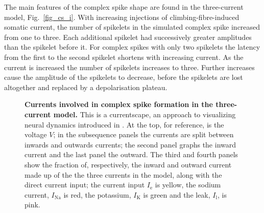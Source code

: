 \documentclass[twocolumn]{svjour3}          %
\newcommand{\mse}{\,\mathrm{ms}}
\renewcommand{\k}{\mathrm{K}}
\newcommand{\na}{\mathrm{Na}}
\newcommand{\leak}{\mathrm{l}}
\begin{document}

The main features of the complex spike shape are found in the
three-current model, Fig.~\ref{fig_cs_i}. With increasing injections
of climbing-fibre-induced somatic current, the number of spikelets in
the simulated complex spike increased from one to three. Each
additional spikelet had successively greater amplitudes than the
spikelet before it. For complex spikes with only two spikelets the
latency from the first to the second spikelet shortens with increasing
current. As the current is increased the number of spikelets increases
to three. Further increases cause the amplitude of the spikelets to
decrease, before the spikelets are lost altogether and replaced by a
depolarisation plateau. 

\begin{figure}[!ht]
  \begin{center}
    
    \end{center}
  \caption{\textbf{Currents involved in complex spike formation in the
      three-current model.} This is a currentscape, an approach to
    visualizing neural dynamics introduced in
    \cite{AlonsoMarder2019}. At the top, for reference, is the voltage
    $V$; in the subsequence panels the currents are split between
    inwards and outwards currents; the second panel graphs the inward
    current and the last panel the outward. The third and fourth
    panels show the fraction of, respectively, the inward and outward
    current made up of the the three currents in the model, along with
    the direct current input; the current input $I_{\mathrm{e}}$ is yellow,
    the sodium current, $I_{\na}$ is red, the potassium, $I_{\k}$ is
    green and the leak, $I_{\leak}$, is pink.}
\label{currents_3}
\end{figure}
\end{document}
